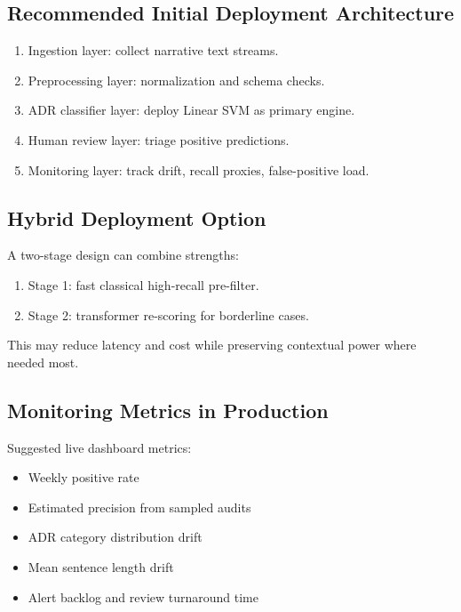 \documentclass[11pt]{article}
\begin{document}
\subsection{Recommended Initial Deployment Architecture}

\begin{enumerate}
  \item Ingestion layer: collect narrative text streams.
  \item Preprocessing layer: normalization and schema checks.
  \item ADR classifier layer: deploy Linear SVM as primary engine.
  \item Human review layer: triage positive predictions.
  \item Monitoring layer: track drift, recall proxies, false-positive load.
\end{enumerate}

\subsection{Hybrid Deployment Option}

A two-stage design can combine strengths:


\begin{enumerate}
  \item Stage 1: fast classical high-recall pre-filter.
  \item Stage 2: transformer re-scoring for borderline cases.
\end{enumerate}

This may reduce latency and cost while preserving contextual power where needed most.


\subsection{Monitoring Metrics in Production}

Suggested live dashboard metrics:


\begin{itemize}
  \item Weekly positive rate
  \item Estimated precision from sampled audits
  \item ADR category distribution drift
  \item Mean sentence length drift
  \item Alert backlog and review turnaround time
\end{itemize}
\end{document}
